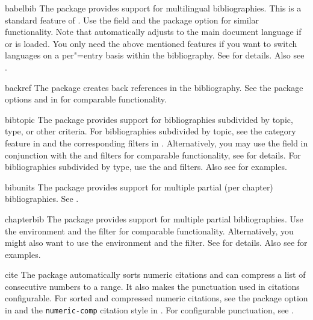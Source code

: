 \documentclass{ltxdockit}[2011/03/25]
\begin{document}
\begin{marglist}

\item[babelbib]
The  package provides support for multilingual bibliographies. This is a standard feature of . Use the  field and the package option  for similar functionality. Note that  automatically adjusts to the main document language if  or  is loaded. You only need the above mentioned features if you want to switch languages on a per"=entry basis within the bibliography. See  for details. Also see .

\item[backref]
The  package creates back references in the bibliography. See the package options  and  in  for comparable functionality.

\item[bibtopic]
The  package provides support for bibliographies subdivided by topic, type, or other criteria. For bibliographies subdivided by topic, see the category feature in  and the corresponding filters in . Alternatively, you may use the  field in conjunction with the  and  filters for comparable functionality, see  for details. For bibliographies subdivided by type, use the  and  filters. Also see  for examples.

\item[bibunits]
The  package provides support for multiple partial (\eg per chapter) bibliographies. See .

\item[chapterbib]
The  package provides support for multiple partial bibliographies. Use the  environment and the  filter for comparable functionality. Alternatively, you might also want to use the  environment and the  filter. See  for details. Also see  for examples.

\item[cite]
The  package automatically sorts numeric citations and can compress a list of consecutive numbers to a range. It also makes the punctuation used in citations configurable. For sorted and compressed numeric citations, see the  package option in  and the \texttt{numeric-comp} citation style in . For configurable punctuation, see .


\end{marglist}
\end{document}
